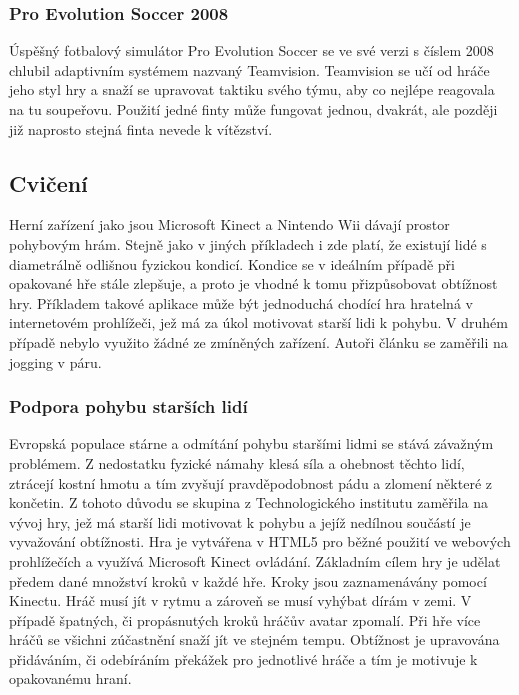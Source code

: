 \subsubsection{Pro Evolution Soccer 2008}

Úspěšný fotbalový simulátor Pro Evolution Soccer se ve své verzi s číslem 2008 chlubil adaptivním systémem nazvaný Teamvision. Teamvision se učí od hráče jeho styl hry a snaží se upravovat taktiku svého týmu, aby co nejlépe reagovala na tu soupeřovu. Použití jedné finty může fungovat jednou, dvakrát, ale později již naprosto stejná finta nevede k vítězství. \cite{6}

\subsection{Cvičení}

Herní zařízení jako jsou Microsoft Kinect a Nintendo Wii dávají prostor pohybovým hrám. Stejně jako v jiných příkladech i zde platí, že existují lidé s diametrálně odlišnou fyzickou kondicí. Kondice se v ideálním případě při opakované hře stále zlepšuje, a proto je vhodné k tomu přizpůsobovat obtížnost hry.
Příkladem takové aplikace může být jednoduchá chodící hra hratelná v internetovém prohlížeči, jež má za úkol motivovat starší lidi k pohybu.
V druhém případě nebylo využito žádné ze zmíněných zařízení. Autoři článku \cite{7} se zaměřili na jogging v páru. 

\subsubsection{Podpora pohybu starších lidí}

Evropská populace stárne a odmítání pohybu staršími lidmi se stává závažným problémem. Z nedostatku fyzické námahy klesá síla a ohebnost těchto lidí, ztrácejí kostní hmotu a tím zvyšují pravděpodobnost pádu a zlomení některé z končetin. Z tohoto důvodu se skupina z Technologického institutu zaměřila na vývoj hry, jež má starší lidi motivovat k pohybu a jejíž nedílnou součástí je vyvažování obtížnosti. \cite{8}
Hra je vytvářena v HTML5 pro běžné použití ve webových prohlížečích a využívá Microsoft Kinect ovládání.
Základním cílem hry je udělat předem dané množství kroků v každé hře. Kroky jsou zaznamenávány pomocí Kinectu. Hráč musí jít v rytmu a zároveň se musí vyhýbat dírám v zemi. V případě špatných, či propásnutých kroků hráčův avatar zpomalí.
Při hře více hráčů se všichni zúčastnění snaží jít ve stejném tempu. Obtížnost je upravována přidáváním, či odebíráním překážek pro jednotlivé hráče a tím je motivuje k opakovanému hraní.

